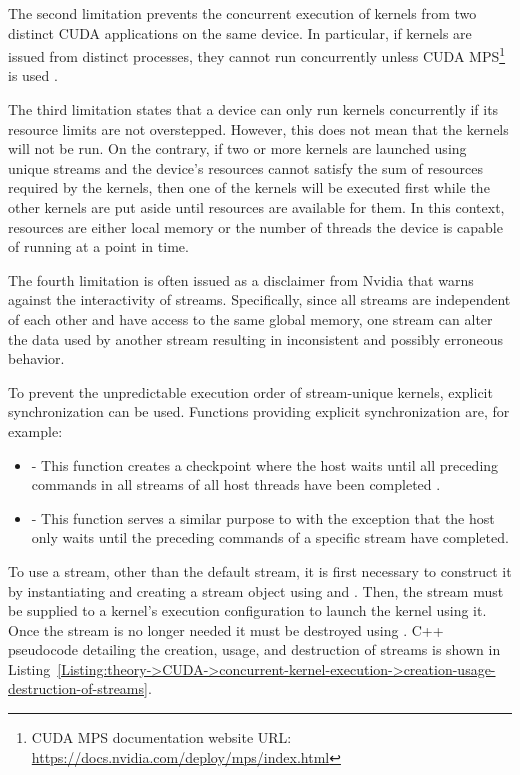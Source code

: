 The second limitation prevents the concurrent execution of kernels from two distinct CUDA applications on the same device.
In particular, if kernels are issued from distinct processes, they cannot run concurrently unless CUDA MPS\footnote{CUDA MPS documentation website URL: \url{https://docs.nvidia.com/deploy/mps/index.html}} is used \cite{Crovella16December2016, Crovella17August2017}.

The third limitation states that a device can only run kernels concurrently if its resource limits are not overstepped.
However, this does not mean that the kernels will not be run.
On the contrary, if two or more kernels are launched using unique streams and the device's resources cannot satisfy the sum of resources required by the kernels, then one of the kernels will be executed first while the other kernels are put aside until resources are available for them.
In this context, resources are either local memory or the number of threads the device is capable of running at a point in time.

The fourth limitation is often issued as a disclaimer from Nvidia that warns against the interactivity of streams.
Specifically, since all streams are independent of each other and have access to the same global memory, one stream can alter the data used by another stream resulting in inconsistent and possibly erroneous behavior.

To prevent the unpredictable execution order of stream-unique kernels, explicit synchronization can be used.
Functions providing explicit synchronization are, for example:

\begin{itemize}
	\item {} - This function creates a checkpoint where the host waits until all preceding commands in all streams of all host threads have been completed \cite{NVIDIADecember2022}.
	\item {} - This function serves a similar purpose to  with the exception that the host only waits until the preceding commands of a specific stream have completed.
\end{itemize}

To use a stream, other than the default stream, it is first necessary to construct it by instantiating and creating a stream object using  and .
Then, the stream must be supplied to a kernel's execution configuration to launch the kernel using it.
Once the stream is no longer needed it must be destroyed using .
C++ pseudocode detailing the creation, usage, and destruction of streams is shown in Listing~\ref{Listing:theory->CUDA->concurrent-kernel-execution->creation-usage-destruction-of-streams}.

